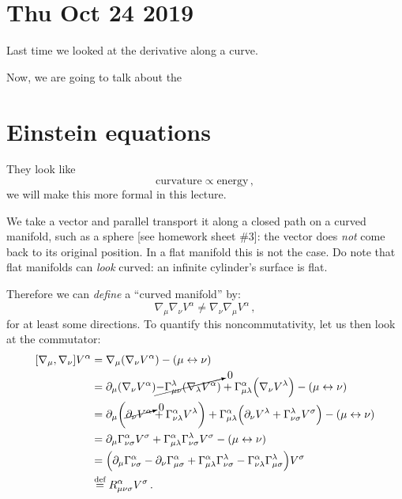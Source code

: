 \documentclass[main.tex]{subfiles}
\begin{document}
\section*{Thu Oct 24 2019}

Last time we looked at the derivative along a curve.

Now, we are going to talk about the

\section{Einstein equations}

They look like 
%
\begin{equation}
  \text{curvature} \propto \text{energy}
\,,
\end{equation}
%
we will make this more formal in this lecture.

We take a vector and parallel transport it along a closed path on a curved manifold, such as a sphere [see homework sheet \#3]: the vector does \emph{not} come back to its original position.
In a flat manifold this is not the case.
Do note that flat manifolds can \emph{look} curved: an infinite cylinder's surface is flat.

Therefore we can \emph{define} a ``curved manifold'' by: 
%
\begin{equation}
  \nabla_{\mu } \nabla_{\nu } V^{\alpha } \neq \nabla_{\nu } \nabla_{\mu } V^{\alpha }
\,,
\end{equation}
%
for at least some directions. To quantify this noncommutativity, let us then look at the commutator: 
%
\begin{subequations}
\begin{align}
  [\nabla_{\mu }, \nabla_{\nu }]V^{\alpha } &= \nabla_{\mu }\qty(\nabla_{\nu } V^{\alpha }) - (\mu \leftrightarrow \nu )  \\
  &= \partial_{\mu } \qty(\nabla_{\nu } V^{\alpha })
  \cancelto{0}{- \Gamma_{\mu \nu }^{\lambda } \qty(\nabla_{\lambda }V^{\alpha })}
  + \Gamma_{\mu \lambda }^{\alpha }\qty(\nabla_{\nu} V^{\lambda }) - (\mu \leftrightarrow \nu )  \\
  &= \partial_{\mu } \qty(\cancelto{0}{\partial_{\nu } V^{\alpha }} + \Gamma_{\nu \lambda }^{\alpha }V^{\lambda })
  + \Gamma_{\mu \lambda }^{\alpha }\qty(\partial_{\nu } V^{\lambda  } + \Gamma_{\nu \sigma  }^{\lambda }V^{\sigma  }) - (\mu \leftrightarrow \nu )  \\
  &= \partial_{\mu } \Gamma_{\nu \sigma  }^{\alpha }V^{\sigma  }
  + \Gamma_{\mu \lambda }^{ \alpha }\Gamma_{\nu \sigma  }^{ \lambda   } V^{\sigma }- (\mu \leftrightarrow \nu )  \\
  &= \qty(
    \partial_{\mu } \Gamma_{\nu \sigma  }^{\alpha }
       - \partial_{\nu } \Gamma_{\mu \sigma  }^{\alpha }
      + \Gamma_{\mu \lambda }^{ \alpha }\Gamma_{\nu \sigma  }^{ \lambda }
      - \Gamma_{\nu \lambda }^{ \alpha }\Gamma_{\mu \sigma  }^{ \lambda }
      )V^{\sigma }  \\
  &\overset{\text{def}}{=} R^{\alpha }_{\mu \nu \sigma }V^{\sigma }
\,.
\end{align}
\end{subequations}
%
\end{document}
